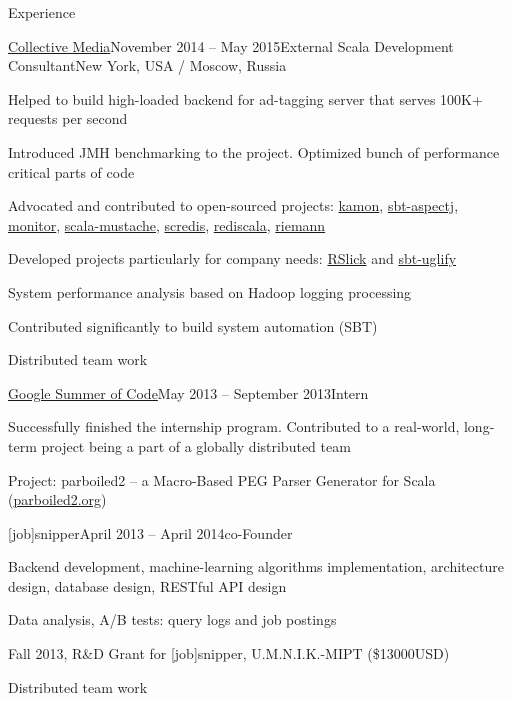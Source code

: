 \documentclass{resume} %
\begin{document}
\begin{rSection}{Experience}
\begin{rSubsection}{\href{http://collective.com}{Collective Media}}{November 2014 -- May 2015}{External Scala Development Consultant}{New York, USA / Moscow, Russia}
\item Helped to build high-loaded backend for ad-tagging server that serves 100K+ requests per second
\item Introduced JMH benchmarking to the project. Optimized bunch of performance critical parts of code
\item Advocated and contributed to open-sourced projects: \href{https://github.com/kamon-io/Kamon}{kamon}, \href{https://github.com/sbt/sbt-aspectj}{sbt-aspectj}, \href{https://github.com/eigengo/monitor}{monitor}, \href{https://github.com/vspy/scala-mustache}{scala-mustache}, \href{https://github.com/Livestream/scredis}{scredis}, \href{https://github.com/etaty/rediscala}{rediscala}, \href{https://github.com/aphyr/riemann}{riemann}
\item Developed projects particularly for company needs: \href{http://github.com/alexander-myltsev/RSlick}{RSlick} and \href{http://github.com/alexander-myltsev/sbt-uglify}{sbt-uglify}
\item System performance analysis based on Hadoop logging processing
\item Contributed significantly to build system automation (SBT)
\item Distributed team work
\end{rSubsection}


\begin{rSubsection}{\href{https://www.google-melange.com/gsoc/project/details/google/gsoc2013/alexander__myltsev/5818821692620800}{Google Summer of Code}}{May 2013 -- September 2013}{Intern}{}
\item Successfully finished the internship program. Contributed to a real-world, long-term project being a part of a globally distributed team
\item Project: parboiled2 -- a Macro-Based PEG Parser Generator for Scala (\href{http://parboiled2.org}{parboiled2.org})
\end{rSubsection}


\begin{rSubsection}{[job]snipper}{April 2013 -- April 2014}{co-Founder}{}
\item Backend development, machine-learning algorithms implementation, architecture design, database design, RESTful API design
\item Data analysis, A/B tests: query logs and job postings
\item Fall 2013, R\&D Grant for [job]snipper, U.M.N.I.K.-MIPT (\$13000USD)
\item Distributed team work
\end{rSubsection}


\end{rSection}
\end{document}
